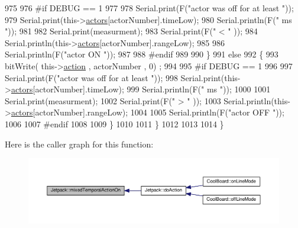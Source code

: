 \begin{DoxyCode}
975 
976 \textcolor{preprocessor}{        #if DEBUG == 1 }
977 
978             Serial.print(F(\textcolor{stringliteral}{"actor was off for at least "}));
979             Serial.print(this->\hyperlink{class_jetpack_a7e16d2f97837f9712a2e6de1c50d99db}{actors}[actorNumber].timeLow);
980             Serial.println(F(\textcolor{stringliteral}{" ms "}));
981 
982             Serial.print(measurment);
983             Serial.print(F(\textcolor{stringliteral}{" < "} ));
984             Serial.println(this->\hyperlink{class_jetpack_a7e16d2f97837f9712a2e6de1c50d99db}{actors}[actorNumber].rangeLow);
985     
986             Serial.println(F(\textcolor{stringliteral}{"actor ON "}));
987     
988 \textcolor{preprocessor}{        #endif  }
989 
990         \}
991         \textcolor{keywordflow}{else} 
992         \{
993             bitWrite( this->\hyperlink{class_jetpack_aca3142925a7b0834b34ae91d26af7765}{action} , actorNumber , 0) ;   
994 
995 \textcolor{preprocessor}{        #if DEBUG == 1 }
996 
997             Serial.print(F(\textcolor{stringliteral}{"actor was off for at least "}));
998             Serial.print(this->\hyperlink{class_jetpack_a7e16d2f97837f9712a2e6de1c50d99db}{actors}[actorNumber].timeLow);
999             Serial.println(F(\textcolor{stringliteral}{" ms "}));
1000 
1001             Serial.print(measurment);
1002             Serial.print(F(\textcolor{stringliteral}{" > "} ));
1003             Serial.println(this->\hyperlink{class_jetpack_a7e16d2f97837f9712a2e6de1c50d99db}{actors}[actorNumber].rangeLow);
1004 
1005             Serial.println(F(\textcolor{stringliteral}{"actor OFF "}));
1006     
1007 \textcolor{preprocessor}{        #endif              }
1008 
1009         \}
1010 
1011     \}
1012 
1013     
1014 \}
\end{DoxyCode}
Here is the caller graph for this function\+:\nopagebreak
\begin{figure}[H]
\begin{center}
\leavevmode
\includegraphics[width=350pt]{df/d1d/class_jetpack_af44bc8a08818e4433dfb1c7104601f12_icgraph}
\end{center}
\end{figure}
\mbox{\label{class_jetpack_a65ce9533c39fa71e4945b970bf14b980}} 
